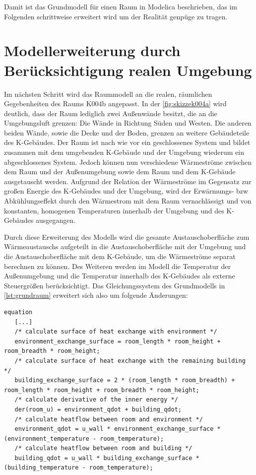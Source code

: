 Damit ist das Grundmodell für einen Raum in Modelica beschrieben, das im Folgenden schrittweise erweitert wird um der Realität genpüge zu tragen.

\section{Modellerweiterung durch Berücksichtigung realen Umgebung}

Im nächsten Schritt wird das Raummodell an die realen, räumlichen Gegebenheiten des Raums K004b angepasst. In der \ref{fig:skizzek004a} wird deutlich, dass der Raum lediglich zwei Außenwände besitzt, die an die Umgebungsluft grenzen: Die Wände in Richtung Süden und Westen. Die anderen beiden Wände, sowie die Decke und der Boden, grenzen an weitere Gebäudeteile des K-Gebäudes. Der Raum ist nach wie vor ein geschlossenes System und bildet zusammen mit dem umgebenden K-Gebäude und der Umgebung wiederum ein abgeschlossenes System. Jedoch können nun verschiedene Wärmeströme zwischen dem Raum und der Außenumgebung sowie dem Raum und dem K-Gebäude ausgetauscht werden. Aufgrund der Relation der Wärmeströme im Gegensatz zur großen Energie des K-Gebäudes und der Umgebung, wird der Erwärmungs- bzw Abkühlungseffekt durch den Wärmestrom mit dem Raum vernachlässigt und von konstanten, homogenen Temperaturen innerhalb der Umgebung und des K-Gebäudes ausgegangen.

Durch diese Erweiterung des Modells wird die gesamte Austauschoberfläche zum Wärmeaustauschs aufgeteilt in die Austauschoberfläche mit der Umgebung und die Austauschoberfläche mit dem K-Gebäude, um die Wärmeströme separat berechnen zu können. Des Weiteren werden im Modell die Temperatur der Außenumgebung und die Temperatur innerhalb des K-Gebäudes als externe Steuergrößen berücksichtigt. Das Gleichungssystem des Grundmodells in \ref{lst:grundraum} erweitert sich also um folgende Änderungen:

\begin{lstlisting}[language=Modelica,label=lst:raumeins]
equation
   [...]
   /* calculate surface of heat exchange with environment */
   environment_exchange_surface = room_length * room_height + room_breadth * room_height;
   /* calculate surface of heat exchange with the remaining building */
   building_exchange_surface = 2 * (room_length * room_breadth) + room_length * room_height + room_breadth * room_height;
   /* calculate derivative of the inner energy */
   der(room_u) = environment_qdot + building_qdot;
   /* calculate heatflow between room and environment */
   environment_qdot = u_wall * environment_exchange_surface * (environment_temperature - room_temperature);
   /* calculate heatflow between room and building */
   building_qdot = u_wall * building_exchange_surface * (building_temperature - room_temperature);
\end{lstlisting}


